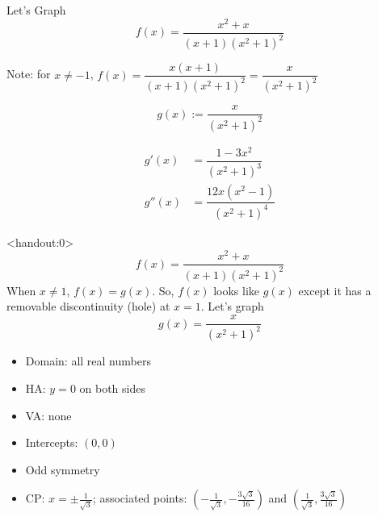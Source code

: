 \begin{frame}[t]{Let's Graph}\AnswerYes\MoreSpace{}
\[f(x)=\frac{x^2+x}{(x+1)(x^2+1)^2}\]\pause

Note: for $x \neq -1$, $f(x) = \dfrac{x(x+1)}{(x+1)(x^2+1)^2} = \dfrac{x}{(x^2+1)^2}$\pause


\[g(x):=\frac{x}{(x^2+1)^2}\]\pause

\begin{align*}
g'(x)&=\dfrac{1-3x^2}{(x^2+1)^3} \\
g''(x)&=\dfrac{12x(x^2-1)}{(x^2+1)^4}
\end{align*}
\end{frame}
\begin{frame}<handout:0>
\color{answercolor}
\[f(x)=\frac{x^2+x}{(x+1)(x^2+1)^2}\]\pause
When $x \neq 1$, $f(x)=g(x)$. So, $f(x)$ looks like $g(x)$ except it has a removable discontinuity (hole) at $x=1$. Let's graph 
\[g(x)=\frac{x}{(x^2+1)^2}\]
\begin{itemize}\color{answercolor}
\item Domain: all real numbers
\item HA: $y=0$ on both sides
\item VA: none
\item Intercepts: $(0,0)$
\item Odd symmetry
\item CP: $x=\pm\frac1{\sqrt 3}$; associated points: $\left(-\frac1{\sqrt 3} ,- \frac{3\sqrt3}{16} \right)$ and 
$\left(\frac1{\sqrt 3} , \frac{3\sqrt3}{16} \right)$
\end{itemize}
\end{frame}

